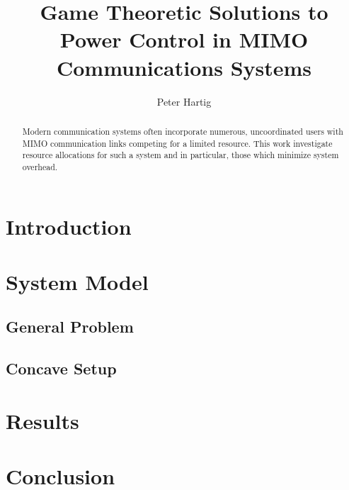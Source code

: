 \documentclass[12pt,a4paper]{report}
\title{Game Theoretic Solutions to Power Control in MIMO Communications Systems}
\author{Peter Hartig}
\begin{document}
\maketitle

\begin{abstract}
Modern communication systems often incorporate numerous, uncoordinated users with MIMO communication links competing for a limited resource. This work investigate resource allocations for such a system and in particular, those which minimize system overhead. 
\end{abstract}

\newpage
\tableofcontents
\newpage

\section{Introduction}


\section{System Model}

\subsection{General Problem}
\subsection{Concave Setup}

\section{Results}

\section{Conclusion}

\newpage

\end{document}
